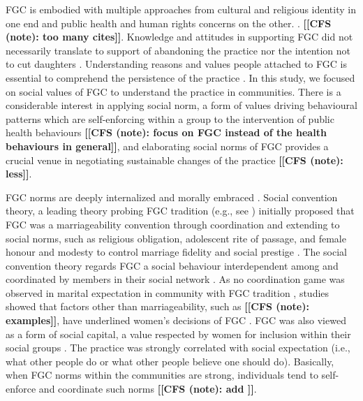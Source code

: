 \documentclass[12pt,]{article}
\newcommand{\comment}[1]{\textbf{[[#1]]}}
\newcommand{\cfonly}[1]{\comment{CFS (note): #1}}
\begin{document}
FGC is embodied with multiple approaches from cultural and religious identity in one end and public health and human rights concerns on the other. \cite{AhmeKare18, BergDeni13a, Boyl02, BoylMcMo02, Grue01, KhosBane17, KimaShell18, McCh15, SchuLien13, WHO12}. \cfonly{too many cites}.  Knowledge and attitudes in supporting FGC did not necessarily translate to support of abandoning the practice nor the intention not to cut daughters \cite{ChegAske04}.  Understanding reasons and values people attached to FGC is essential to comprehend the persistence of the practice \cite{Bicc10, Cami15, CislHeis18, Mack96}.  In this study, we focused on social values of FGC to understand the practice in communities.  There is a considerable interest in applying social norm, a form of values driving behavioural patterns which are self-enforcing within a group \cite{Youn15} to the intervention of public health behaviours \cite{Ajze91, Ajze02, CislHeis18a, MillPrin16, MollRima10, RimaLapi15} \cfonly{focus on FGC instead of the health behaviours in general}, and elaborating social norms of FGC provides a crucial venue in negotiating sustainable changes of the practice \cite{Bicc10, BiccMari15, BoylCorl010, DuncWand11, Drol11, EffeVogt15, Hayf05, HayfTrin11, Grue05, Hodg11,KandNwak09, Mack96, Mack00, MackLeJe08, OdukAfol17, RimaLapi15, Youn02, Youn11, UNIC10, UNIC13} \cfonly{less}. 

FGC norms are deeply internalized and morally embraced \cite{SchuLien13}.  Social convention theory, a leading theory probing FGC tradition (e.g., see \cite{BoylMcMo02, BoylCorl10, FreyJohn07, FrieMahm13, Hayf05, KandMwek09, Mack96, Mack06, ReigGonz14, YirgKass12}) initially proposed that FGC was a marriageability convention through coordination \cite{Mack96} and extending to social norms, such as religious obligation, adolescent rite of passage, and female honour and modesty to control marriage fidelity and social prestige \cite{Mack00, MackLeJe08, update}.   The social convention theory regards FGC a social behaviour interdependent among and coordinated by members in their social network \cite{Mack00, MackLeJe08, ShelWand11}.  As no coordination game was observed in marital expectation in community with FGC tradition \cite{EffeVogt15}, studies showed that factors other than marriageability, such as \cfonly{examples}, have underlined women’s  decisions of FGC \cite{AlcaGonz13, BellNova15, EffeVogt15, Hayf05, Mack09, PashPonn16, Rima08, ShelWand11, more?}.  FGC was also viewed as a form of social capital, a value respected by women for inclusion within their social groups \cite{ShelWand11}.   The practice was strongly correlated with social expectation (i.e., what other people do or what other people believe one should do)\cite{BiccMari15}.   Basically, when FGC norms within the communities are strong, individuals tend to self-enforce and coordinate such norms \cite{Ajze02, Hayf05, KandNwak09, KandShel19, Mack96, Mack06, MackLeJe08, ThomMadd92} \cfonly{add \cite{Bicc15}}.
\end{document}
